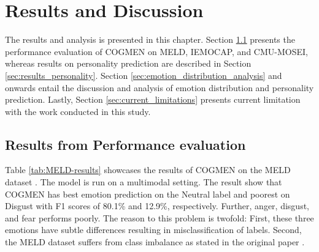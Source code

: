 \chapter{Results and Discussion}
The results and analysis is presented in this chapter. Section \ref{sec:performance_evaluation} presents the performance evaluation of COGMEN on MELD, IEMOCAP, and CMU-MOSEI, whereas results on personality prediction are described in Section \ref{sec:results_personality}. Section \ref{sec:emotion_distribution_analysis} and onwards entail the discussion and analysis of emotion distribution and personality prediction. Lastly, Section \ref{sec:current_limitations} presents current limitation with the work conducted in this study. 

\section{Results from Performance evaluation}
\label{sec:performance_evaluation}
Table \ref{tab:MELD-results} showcases the results of COGMEN on the MELD dataset \cite{HP_Advanced}. The model is run on a multimodal setting. The result show that COGMEN has best emotion prediction on the Neutral label and poorest on Disgust with F1 scores of 80.1\% and 12.9\%, respectively. Further, anger, disgust, and fear performs poorly. The reason to this problem is twofold: First, these three emotions have subtle differences resulting in misclassification of labels. Second, the MELD dataset suffers from class imbalance as stated in the original paper \cite{meld_dataset}.   
%
\begin{table}[h]
    \caption{Results on the MELD dataset for 7-emotion class. Avg. denotes the weighted average.}
    \centering
    \label{tab:MELD-results}
\end{table}
